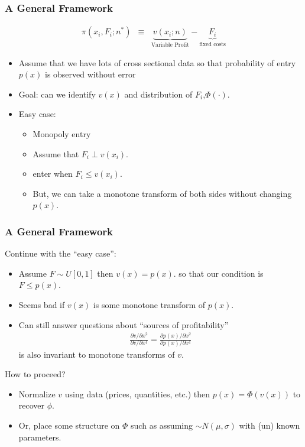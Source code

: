 \begin{frame}
\frametitle{A General Framework}
\begin{eqnarray*}
\pi(x_i, F_i;  n^*) &\equiv& \underbrace{v(x_i;n)}_{\mbox{Variable Profit}} -\underbrace{F_i}_{\mbox{fixed costs}}
\end{eqnarray*}
\begin{itemize}
\item Assume that we have lots of cross sectional data so that probability of entry $p(x)$ is observed without error
\item Goal: can we identify $v(x)$ and distribution of $F_i$,$\Phi(\cdot)$.
\item Easy case: 
\begin{itemize}
\item Monopoly entry
\item Assume that $F_i \perp v(x_i)$.
\item enter when $F_i \leq v(x_i)$. \pause
\item But, we can take a monotone transform of both sides without changing $p(x)$.
\end{itemize}
\end{itemize}
\end{frame}

\begin{frame}
\frametitle{A General Framework}
Continue with the ``easy case'':
\begin{itemize}
\item Assume $F \sim U[0,1]$ then $v(x) = p(x)$. so that our condition is $F \leq p(x)$.
\item Seems bad if $v(x)$ is some monotone transform of $p(x)$.
\item Can still answer questions about ``sources of profitability''
\begin{eqnarray*}
\frac{\partial v/ \partial x^2}{\partial v/ \partial x^1} = \frac{\partial p(x) / \partial x^2}{\partial p(x)/ \partial x^1}
\end{eqnarray*}
is also invariant to monotone transforms of $v$.
\end{itemize}
How to proceed?
\begin{itemize}
\item Normalize $v$ using data (prices, quantities, etc.) then $p(x) = \Phi(v(x))$ to recover $\phi$.
\item Or, place some structure on $\Phi$ such as assuming $\sim N(\mu,\sigma)$ with (un) known parameters.
\end{itemize}
\end{frame}

